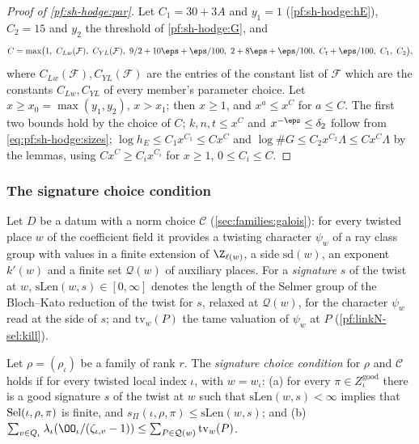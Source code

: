 \begin{proof}[Proof of \cref{pf:sh-hodge:par}]
Let $C_1=30+3A$ and $y_1=1$ (\cref{pf:sh-hodge:hE}), $C_2=15$ and $y_2$ the threshold of \cref{pf:sh-hodge:G}, and
\[
C=\max\bigl(1,\ C_{Lw}(\mathcal F),\ C_{YL}(\mathcal F),\ 9/2+10\eps+\eps/100,\ 2+8\eps+\eps/100,\ C_t+\eps/100,\ C_1,\ C_2\bigr),
\]
where $C_{Lw}(\mathcal F),C_{YL}(\mathcal F)$ are the entries of the constant list of $\mathcal F$ which are the constants $C_{Lw},C_{YL}$ of every
member's parameter choice. Let $x\ge x_0=\max(y_1,y_2)$, $x>x_1$; then $x\ge1$, and $x^a\le x^C$ for $a\le C$. The first two bounds hold by the choice
of $C$; $k,n,t\le x^C$ and $x^{-\eps}\le\delta_2$ follow from \eqref{eq:pf:sh-hodge:sizes}; $\log h_E\le C_1x^{C_1}\le Cx^C$ and
$\log\#G\le C_2x^{C_2}\Lambda\le Cx^C\Lambda$ by the lemmas, using $Cx^C\ge C_ix^{C_i}$ for $x\ge1$, $0\le C_i\le C$.
\end{proof}

\subsubsection{The signature choice condition}

Let $D$ be a datum with a norm choice $\mathcal C$ (\cref{sec:families:galois}): for every twisted place $w$ of the coefficient field it provides a
twisting character $\psi_w$ of a ray class group with values in a finite extension of $\Z_{\ell(w)}$, a side $\mathrm{sd}(w)$, an exponent $k'(w)$
and a finite set $\mathcal Q(w)$ of auxiliary places. For a \emph{signature} $s$ of the twist at $w$, $\mathrm{sLen}(w,s)\in[0,\infty]$ denotes the
length of the Selmer group of the Bloch--Kato reduction of the twist for $s$, relaxed at $\mathcal Q(w)$, for the character $\psi_w$ read at the side of
$s$; and $\mathrm{tv}_w(P)$ the tame valuation of $\psi_w$ at $P$ (\cref{pf:linkN-sel:kill}).

\begin{definition}\label{pf:sh-hodge:def-sig}
Let $\rho=(\rho_\iota)$ be a family of rank $r$. The \emph{signature choice condition} for $\rho$ and $\mathcal C$ holds if for every twisted local
index $\iota$, with $w=w_\iota$: (a) for every $\pi\in Z^{\mathrm{good}}_\iota$ there is a good signature $s$ of the twist at $w$ such that
$\mathrm{sLen}(w,s)<\infty$ implies that $\operatorname{Sel}(\iota,\rho,\pi)$ is finite, and $s_\Pi(\iota,\rho,\pi)\le\mathrm{sLen}(w,s)$; and (b)
$\sum_{v\in Q_\iota}\lambda_\iota(\OO_\iota/(\zeta_{\iota,v}-1))\le\sum_{P\in\mathcal Q(w)}\mathrm{tv}_w(P)$.
\end{definition}

